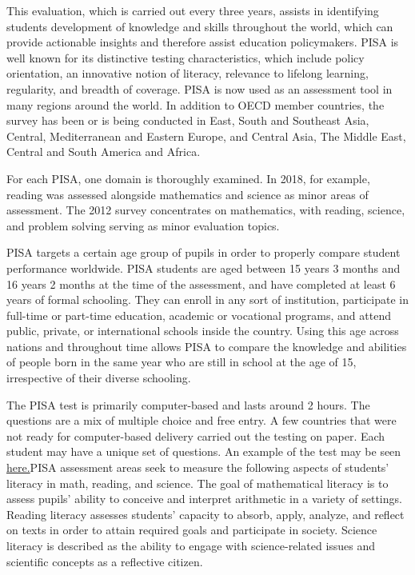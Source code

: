 This evaluation, which is carried out every three years, assists in
identifying students development of knowledge and skills throughout the
world, which can provide actionable insights and therefore assist
education policymakers. PISA is well known for its distinctive testing
characteristics, which include policy orientation, an innovative notion
of literacy, relevance to lifelong learning, regularity, and breadth of
coverage. PISA is now used as an assessment tool in many regions around
the world. In addition to OECD member countries, the survey has been or
is being conducted in East, South and Southeast Asia, Central,
Mediterranean and Eastern Europe, and Central Asia, The Middle East,
Central and South America and Africa.

For each PISA, one domain is thoroughly examined. In 2018, for example,
reading was assessed alongside mathematics and science as minor areas of
assessment. The 2012 survey concentrates on mathematics, with reading,
science, and problem solving serving as minor evaluation topics.

PISA targets a certain age group of pupils in order to properly compare
student performance worldwide. PISA students are aged between 15 years 3
months and 16 years 2 months at the time of the assessment, and have
completed at least 6 years of formal schooling. They can enroll in any
sort of institution, participate in full-time or part-time education,
academic or vocational programs, and attend public, private, or
international schools inside the country. Using this age across nations
and throughout time allows PISA to compare the knowledge and abilities
of people born in the same year who are still in school at the age of
15, irrespective of their diverse schooling.

The PISA test is primarily computer-based and lasts around 2 hours. The
questions are a mix of multiple choice and free entry. A few countries
that were not ready for computer-based delivery carried out the testing
on paper. Each student may have a unique set of questions. An example of
the test may be seen \href{https://www.oecd.org/pisa/test/}{here.}PISA
assessment areas seek to measure the following aspects of students'
literacy in math, reading, and science. The goal of mathematical
literacy is to assess pupils' ability to conceive and interpret
arithmetic in a variety of settings. Reading literacy assesses students'
capacity to absorb, apply, analyze, and reflect on texts in order to
attain required goals and participate in society. Science literacy is
described as the ability to engage with science-related issues and
scientific concepts as a reflective citizen.

